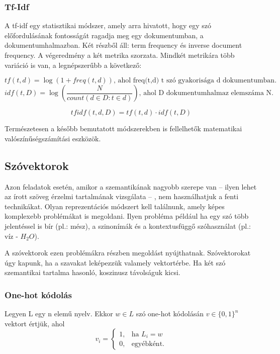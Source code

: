 \subsubsection{Tf-Idf}

A tf-idf egy statisztikai módszer, amely arra hivatott, hogy egy szó előfordulásának fontosságát ragadja meg egy dokumentumban, a dokumentumhalmazban. Két részből áll: term frequency és inverse document frequency. A végeredmény a két metrika szorzata. Mindkét metrikára több variáció is van, a legnépszerűbb a következő:

\begin{definition}
$$tf\left(t,d\right) = \log \left( 1 + freq\left(t,d\right)\right) \text{, ahol freq(t,d) t szó gyakorisága d dokumentumban.}$$
$$idf\left(t,D\right) = \log \left( \frac{N}{count \left( d \in D:t \in d \right) } \right) \text{, ahol D dokumentumhalmaz elemszáma N.}$$

$$tfidf(t,d,D) = tf(t,d) \cdot idf(t,D)$$

\end{definition}

\begin{note}
	Természetesen a később bemutatott módszerekben is fellelhetők matematikai valószínűségszámítási eszközök.
\end{note}

\subsection{Szóvektorok}

Azon feladatok esetén, amikor a szemantikának nagyobb szerepe van – ilyen lehet az írott szöveg érzelmi tartalmának vizsgálata – , nem használhatjuk a fenti technikákat. Olyan reprezentációs módszert kell találnunk, amely képes komplexebb problémákat is megoldani. Ilyen probléma például ha egy szó több jelentéssel is bír (pl.: mész), a szinonímák és a kontextusfüggő szóhasználat (pl.: víz - $H_2O$).

A szóvektorok ezen problémákra részben megoldást nyújthatnak. Szóvektorokat úgy kapunk, ha a szavakat leképezzük valamely vektortérbe. Ha két szó szemantikai tartalma hasonló, koszinusz távolságuk kicsi.

\subsubsection{One-hot kódolás}

\begin{definition}
Legyen L egy n elemű nyelv. Ekkor $w \in L$ szó one-hot kódolásán $v \in \{0,1\}^n$ vektort értjük, ahol 
\[
v_i= 
\begin{cases}
1,				& \text{ha } L_i = w\\
0,              & \text{egyébként.}
\end{cases}
\]
\end{definition}

